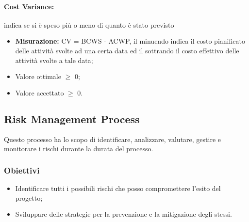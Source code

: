 		\paragraph{Cost Variance:}
		indica se si è speso più o meno di quanto è stato previsto
		\begin{itemize}
			\item \textbf{Misurazione: } CV = BCWS - ACWP, il minuendo indica il costo pianificato delle attività svolte ad una certa data ed il sottrando il costo effettivo delle attività svolte a tale data;
			\item Valore ottimale $\geq$ 0;
			\item Valore accettato $\geq$ 0.
		\end{itemize}

	\subsection{Risk Management Process}
Questo processo ha lo scopo di identificare, analizzare, valutare, gestire e monitorare i rischi durante la durata del processo.
\subsubsection{Obiettivi}
\begin{itemize}
	\item Identificare tutti i possibili rischi che posso compromettere l'esito del progetto;
	\item Sviluppare delle strategie per la prevenzione e la mitigazione degli stessi.
\end{itemize}

